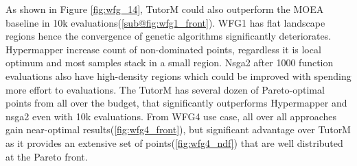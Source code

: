     As shown in Figure \ref{fig:wfg_14}, TutorM could also outperform the MOEA baseline in 10k evaluations(\ref{sub@fig:wfg1_front}). WFG1 has flat landscape regions hence the convergence of genetic algorithms significantly deteriorates. Hypermapper increase count of non-dominated points, regardless it is local optimum and most samples stack in a small region. Nsga2 after 1000 function evaluations also have high-density regions which could be improved with spending more effort to evaluations. The TutorM has several dozen of Pareto-optimal points from all over the budget, that significantly outperforms Hypermapper and nsga2 even with 10k evaluations. 
    From WFG4 use case, all over all approaches gain near-optimal results(\ref{fig:wfg4_front}), but significant advantage over TutorM as it provides an extensive set of points(\ref{fig:wfg4_ndf}) that are well distributed at the Pareto front.



